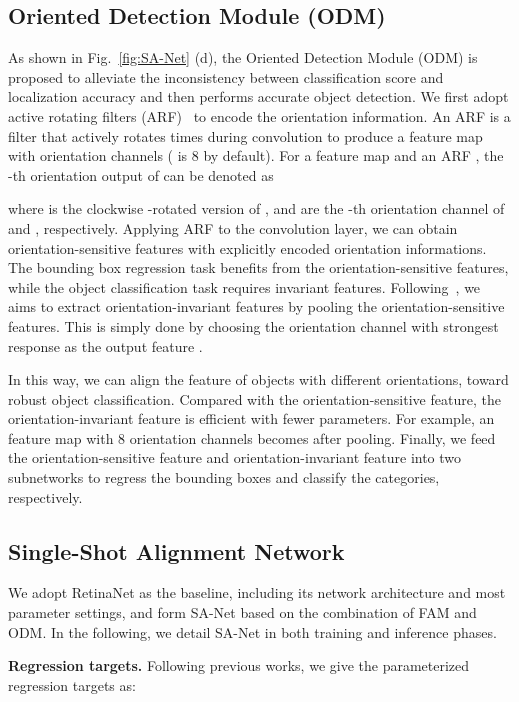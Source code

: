 \documentclass[10pt,journal,final]{IEEEtran}
\begin{document}
\subsection{Oriented Detection Module (ODM)}
\label{sec:odm}
As shown in Fig.~\ref{fig:SA-Net} (d), the Oriented Detection Module (ODM) is proposed to alleviate the inconsistency between classification score and localization accuracy and then performs accurate object detection. We first adopt active rotating filters (ARF)~\cite{zhou2017orn} to encode the orientation information. An ARF is a  filter that actively rotates  times during convolution to produce a feature map with  orientation channels ( is 8 by default). For a feature map  and an ARF , the -th orientation output of  can be denoted as

where  is the clockwise -rotated version of ,  and  are the -th orientation channel of  and , respectively. Applying ARF to the convolution layer, we can obtain orientation-sensitive features with explicitly encoded orientation informations. The bounding box regression task benefits from the orientation-sensitive features, while the object classification task requires invariant features. Following~\cite{zhou2017orn}, we aims to extract orientation-invariant features by pooling the orientation-sensitive features. This is simply done by choosing the orientation channel with strongest response as the output feature .

In this way, we can align the feature of objects with different orientations, toward robust object classification. Compared with the orientation-sensitive feature, the orientation-invariant feature is efficient with fewer parameters. For example, an  feature map with 8 orientation channels becomes  after pooling. Finally, we feed the orientation-sensitive feature and orientation-invariant feature into two subnetworks to regress the bounding boxes and classify the categories, respectively.

\subsection{Single-Shot Alignment Network}
\label{sec:san}
We adopt RetinaNet as the baseline, including its network architecture and most parameter settings, and form SA-Net based on the combination of FAM and ODM. In the following, we detail SA-Net in both training and inference phases.

{\bf Regression targets.} Following previous works, we give the parameterized regression targets as:
\end{document}
